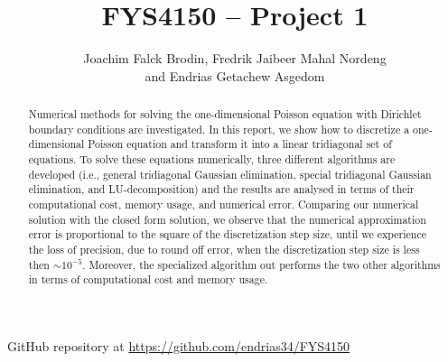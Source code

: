 \documentclass[a4paper]{article}
\begin{document}
\title{FYS4150 -- Project 1}
\author{Joachim Falck Brodin,
        Fredrik Jaibeer Mahal Nordeng\\ 
        and Endrias Getachew Asgedom}
    

\maketitle
\begin{abstract}
\noindent
Numerical methods for solving the one-dimensional Poisson equation with Dirichlet boundary conditions are investigated. In this report, we show how to discretize a one-dimensional Poisson equation and transform it into a linear tridiagonal set of equations. To solve these equations numerically, three different algorithms are developed (i.e., general tridiagonal Gaussian elimination, special tridiagonal Gaussian elimination, and LU-decomposition) and the results are analysed in terms of their computational cost, memory usage, and numerical error. Comparing our numerical solution with the closed form solution, we observe that the numerical approximation error is proportional to the square of the discretization step size, until we experience the loss of precision, due to round off error, when the discretization step size is less then $\sim10^{-5}$. Moreover, the specialized algorithm out performs the two other algorithms in terms of computational cost and memory usage. 
\end{abstract}
\newpage

\tableofcontents

\begin{center}
    GitHub repository at \url{https://github.com/endrias34/FYS4150}
\end{center}

\newpage

\newcommand{\half}{\frac{1}{2}}
\newcommand{\dx}{{\Delta x}}
\newcommand{\bigO}{{\mathcal{O}}}
\end{document}

